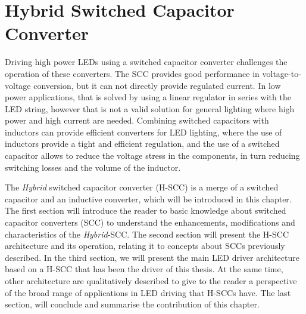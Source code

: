 \chapter{Hybrid Switched Capacitor Converter}

Driving high power LEDs using a switched capacitor converter challenges the operation of these converters. The SCC provides good performance in voltage-to-voltage conversion, but it can not directly provide regulated current. In low power applications, that is solved by using a linear regulator in series with the LED string, however that is not a valid solution for general lighting where high power and high current are needed. Combining switched capacitors with inductors can provide efficient converters for LED lighting, where the use of inductors provide a tight and efficient regulation, and the use of a switched capacitor allows to reduce the voltage stress in the components, in turn reducing switching losses and the volume of the inductor.

The \emph{Hybrid} switched capacitor converter (H-SCC) is a merge of a switched capacitor and an inductive converter, which will be introduced in this chapter. The first section will introduce the reader to basic knowledge about switched capacitor converters (SCC) to understand the enhancements, modifications and characteristics of the \emph{Hybrid}-SCC. The second section will present the H-SCC architecture and its operation, relating it to concepts about SCCs previously described. In the third section, we will present the main LED driver architecture based on a H-SCC that has been the driver of this thesis. At the same time, other architecture are qualitatively described to give to the reader a perspective of the broad range of applications in LED driving that H-SCCs have. The last section, will conclude and summarise the contribution of this chapter.


